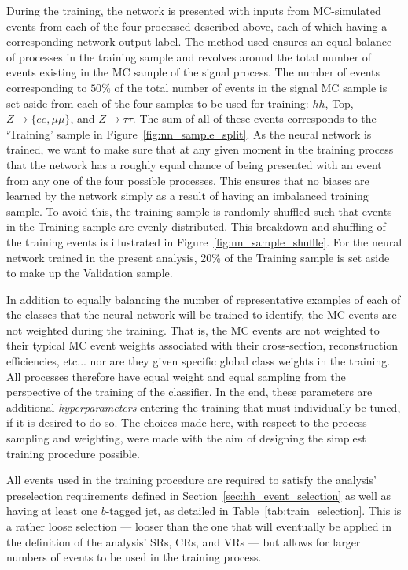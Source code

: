 During the training, the network is presented with inputs from MC-simulated events from each of the
four processed described above, each of which having a corresponding network output label.
The method used ensures an equal balance of processes in the training sample and revolves around
the total number of events existing in the MC sample of the signal process.
The number of events corresponding to $50\%$ of the total number of events in the signal MC sample
is set aside from each of the four samples to be used for training: $hh$, Top, $Z\rightarrow \{ee,\mu\mu\}$,
and $Z \rightarrow \tau\tau$.
The sum of all of these events corresponds to the `Training' sample in Figure~\ref{fig:nn_sample_split}.
As the neural network is trained, we want to make sure that at any given moment in the training process that the
network has a roughly equal chance of being presented with an event from any one of the four possible processes.
This ensures that no biases are learned by the network simply as a result of having an imbalanced training sample.
To avoid this, the training sample is randomly shuffled such that events in the Training sample are evenly distributed.
This breakdown and shuffling of the training events is illustrated in Figure~\ref{fig:nn_sample_shuffle}.
For the neural network trained in the present analysis, 20\% of the Training sample is set aside to make up
the Validation sample.

In addition to equally balancing the number of representative examples of each of the classes
that the neural network will be trained to identify, the MC events are not weighted during the training.
That is, the MC events are not weighted to their typical MC event weights associated with their
cross-section, reconstruction efficiencies, etc... nor are they given specific global class weights in the training.
All processes therefore have equal weight and equal sampling from the perspective of the training of the
classifier.
In the end, these parameters are additional \textit{hyperparameters} entering the training that must individually be tuned, if it is
desired to do so.
The choices made here, with respect to the process sampling and weighting, were made with the aim of designing the simplest training procedure possible.

All events used in the training procedure are required to satisfy the analysis' preselection
requirements defined in Section~\ref{sec:hh_event_selection} as well as having at least one $b$-tagged
jet, as detailed in Table~\ref{tab:train_selection}.
This is a rather loose selection --- looser than the one that will eventually be applied in the definition
of the analysis' SRs, CRs, and VRs --- but allows for larger numbers of events to be used in the training
process.

